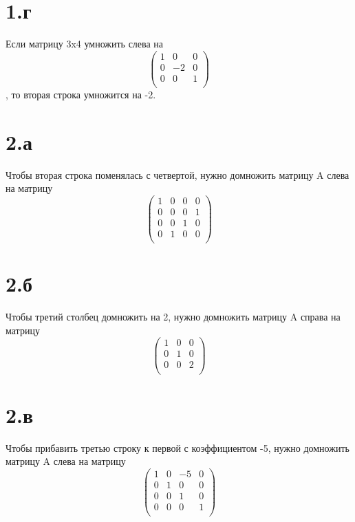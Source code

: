 \documentclass[a4paper]{article}
\begin{document}
\section*{1.г}
Если матрицу 3x4 умножить слева на
\begin{equation*}
\begin{pmatrix}
1 & 0 & 0\\
0 & -2 & 0\\
0 & 0 & 1\\
\end{pmatrix}
\end{equation*}, то вторая строка умножится на -2.



\section*{2.а}
Чтобы вторая строка поменялась с четвертой, нужно домножить матрицу A слева на матрицу 
\begin{equation*}
\begin{pmatrix}
1 & 0 & 0 & 0\\
0 & 0 & 0 & 1\\
0 & 0 & 1 & 0\\
0 & 1 & 0 & 0\\
\end{pmatrix}
\end{equation*}




\section*{2.б}
Чтобы третий столбец домножить на 2, нужно домножить матрицу A справа на матрицу 
\begin{equation*}
\begin{pmatrix}
1 & 0 & 0\\
0 & 1 & 0\\
0 & 0 & 2\\
\end{pmatrix}
\end{equation*}

\section*{2.в}
Чтобы прибавить третью строку к первой с коэффициентом -5, нужно домножить матрицу A слева на матрицу 
\begin{equation*}
\begin{pmatrix}
1 & 0 & -5 & 0\\
0 & 1 & 0 & 0\\
0 & 0 & 1 & 0\\
0 & 0 & 0 & 1\\
\end{pmatrix}
\end{equation*}
\end{document}
